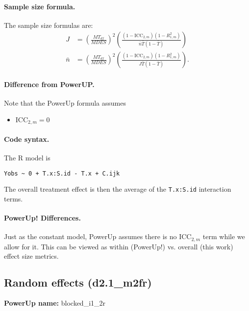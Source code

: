 \documentclass[12pt]{article}
\begin{document}
\paragraph{Sample size formula.} 
The sample size formulas are:
\begin{align}
J &= \left(\frac{MT_{df}}{MDES}\right)^2 \left(\frac{(1-\text{ICC}_{2,m})(1-R^2_{1,m})}{\bar{n} \bar{T} (1 - \bar{T})} \right)\\
\bar{n} &= \left(\frac{MT_{df}}{MDES}\right)^2 \left(\frac{(1-\text{ICC}_{2,m})(1-R^2_{1,m})}{J \bar{T} (1 - \bar{T})} \right) .
\end{align}

\paragraph{Difference from PowerUP.}

Note that the PowerUp formula assumes
\begin{itemize}
\item $\text{ICC}_{2,m} = 0$
\end{itemize}

\paragraph{Code syntax.}
The R model is
\begin{verbatim}
Yobs ~ 0 + T.x:S.id - T.x + C.ijk
\end{verbatim}
The overall treatment effect is then the average of the \texttt{T.x:S.id} interaction terms.

\paragraph{PowerUp! Differences.}
Just as the constant model, PowerUp assumes there is no $\text{ICC}_{2,m}$ term while we allow for it.
This can be viewed as within (PowerUp!) vs. overall (this work) effect size metrics.



\newpage 
\subsection{Random effects (d2.1\_m2fr)}

\textbf{PowerUp name:} blocked\_i1\_2r
\end{document}
